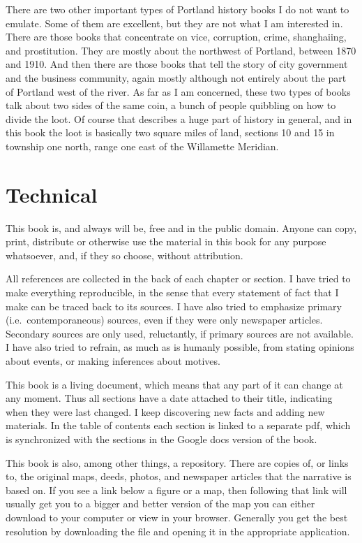 \documentclass[
  12pt,
]{book}
\begin{document}
There are two other important types of Portland history books I do not want to emulate. Some of them are excellent, but they are not what I am interested in. There are those books that concentrate on vice, corruption, crime, shanghaiing, and prostitution. They are mostly about the northwest of Portland, between 1870 and 1910. And then there are those books that tell the story of city government and the business community, again mostly although not entirely about the part of Portland west of the river. As far as I am concerned, these two types of books talk about two sides of the same coin, a bunch of people quibbling on how to divide the loot. Of course that describes a huge part of history in general, and in this book the loot is basically two square miles of land, sections 10 and 15 in township one north, range one east of the Willamette Meridian.

\hypertarget{technical}{%
\section*{Technical}\label{technical}}

This book is, and always will be, free and in the public domain. Anyone can copy, print, distribute or otherwise use the material in this book for any purpose whatsoever, and, if they so choose, without attribution.

All references are collected in the back of each chapter or section. I have tried to make everything reproducible, in the sense that every statement of fact that I make can be traced back to its sources. I have also tried to emphasize primary (i.e.~contemporaneous) sources, even if they were only newspaper articles. Secondary sources are only used, reluctantly, if primary sources are not available. I have also tried to refrain, as much as is humanly possible, from stating opinions about events, or making inferences about motives.

This book is a living document, which means that any part of it can change at any moment. Thus all sections have a date attached to their title, indicating when they were last changed. I keep discovering new facts and adding new materials. In the table of contents each section is linked to a separate pdf, which is synchronized with the sections in the Google docs version of the book.

This book is also, among other things, a repository. There are copies of, or links to, the original maps, deeds, photos, and newspaper articles that the narrative is based on. If you see a link below a figure or a map, then following that link will usually get you to a bigger and better version of the map you can either download to your computer or view in your browser. Generally you get the best resolution by downloading the file and opening it in the appropriate application.
\end{document}
